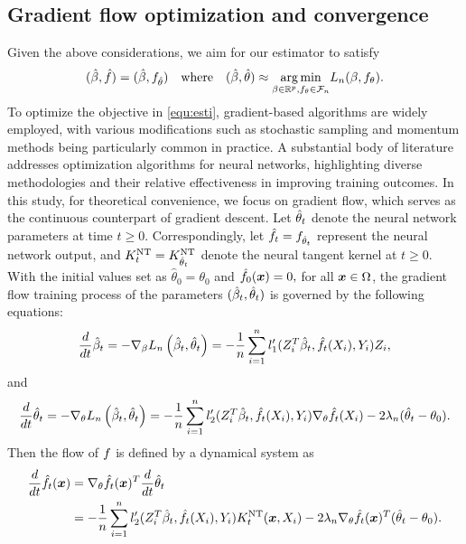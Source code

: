 \subsection{Gradient flow optimization and convergence}

Given the above considerations, we aim for our estimator to satisfy
\begin{equation}\label{equ:esti}
(\hat \beta, \hat f) = (\hat \beta, f_{\hat \theta}) \quad \text{where} \quad (\hat \beta, \hat \theta) \approx \underset{\beta \in \mathbb{R}^p, f_\theta \in \mathcal{F}_n}{\arg \min} L_{n}(\beta, f_\theta).
\end{equation}
To optimize the objective in \eqref{equ:esti}, gradient-based algorithms are widely employed, with various modifications such as stochastic sampling and momentum methods being particularly common in practice. A substantial body of literature addresses optimization algorithms for neural networks, highlighting diverse methodologies and their relative effectiveness in improving training outcomes. In this study, for theoretical convenience, we focus on gradient flow, which serves as the continuous counterpart of gradient descent.
Let $\hat{\theta}_{t}$ denote the neural network parameters at time $t \geq 0$. Correspondingly, let $\hat{f}_{t} = f_{\hat{\theta}_{t}}$ represent the neural network output, and $K^{\mathrm{NT}}_{t}=K^{\mathrm{NT}}_{\hat{\theta}_{t}}$ denote the neural tangent kernel at $t \geq 0$. With the initial values set as $\hat{\theta}_0=\theta_0$ and $\hat{f}_0(\boldsymbol{x}) = 0,$ for all $\boldsymbol{x} \in \Omega$, the gradient flow training process of the parameters \( (\hat{\beta}_{t},\hat{\theta}_{t})\) is governed by the following equations: 
\begin{equation}\label{equ:011}
    \frac{d}{dt}\hat{\beta}_{t}=-\nabla_{\beta} 
L_{n} \left(\hat{\beta}_{t},\hat{\theta}_{t}\right)=-\frac{1}{n}\sum_{i=1}^{n} l_{1}'(Z_{i}^{T}\hat{\beta}_{t}, \hat{f}_{t} (X_{i}), Y_{i}) Z_{i},
\end{equation}
and
\begin{equation}\label{equ:012}
\frac{d}{dt} \hat{\theta}_{t}=-\nabla_{\theta} 
L_{n} \left(\hat{\beta}_{t},\hat{\theta}_{t}\right)=-\frac{1}{n}\sum_{i=1}^{n} l_{2}' (Z_{i}^{T}\hat{\beta}_{t}, \hat{f}_{t} (X_{i}), Y_{i}) \nabla_{\theta}\hat{f}_{t} (X_{i}) - 2 \lambda_{n} (\hat{\theta}_{t} - \theta_{0}).
\end{equation}
Then the flow of $f$ is defined by a dynamical system as 
\begin{equation}\label{equ:013}
\begin{aligned}
\frac{d}{dt} \hat{f}_{t} (\boldsymbol{x})& = \nabla_{\theta}\hat{f}_{t} (\boldsymbol{x})^{T} \frac{d}{dt} \hat{\theta}_{t} \\
& = -\frac{1}{n}\sum_{i=1}^{n} l_{2}' (Z_{i}^{T}\hat{\beta}_{t}, \hat{f}_{t} (X_{i}), Y_{i}) K^{\mathrm{NT}}_{t} (\boldsymbol{x},X_{i}) - 2 \lambda_{n} \nabla_{\theta}\hat{f}_{t} (\boldsymbol{x})^{T} (\hat{\theta}_{t} - \theta_{0}). 
\end{aligned}
\end{equation}


